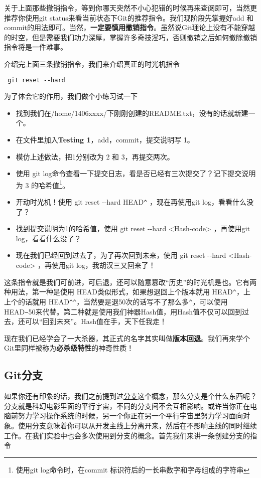 关于上面那些撤销指令，等到你哪天突然不小心犯错的时候再来查阅即可，当然更推荐你使用git status来看当前状态下Git的推荐指令。我们现阶段先掌握好add 和commit的用法即可。当然，\textbf{一定要慎用撤销指令}。虽然说Git理论上没有不能穿越的时空，但是需要我们功力深厚，掌握许多奇技淫巧，否则撤销之后如何撤除撤销指令将是一件难事。

介绍完上面三条撤销指令，我们来介绍真正的时光机指令

\begin{verbatim}
 git reset --hard
\end{verbatim}

为了体会它的作用，我们做个小练习试一下

\begin{exercise}
	\begin{itemize}
		\item 找到我们在/home/1406xxxx/下刚刚创建的README.txt，没有的话就新建一个。
		\item 在文件里加入\textbf{Testing 1}，add，commit，提交说明写 1。
		\item 模仿上述做法，把1分别改为 2 和 3，再提交两次。
		\item 使用 git log命令查看一下提交日志，看是否已经有三次提交了？记下提交说明为 3 的哈希值\footnote{使用git log命令时，在commit 标识符后的一长串数字和字母组成的字符串}。
		\item 开动时光机！使用 git reset -{}-hard HEAD\verb|^| ，现在再使用git log，看看什么没了？
		\item 找到提交说明为1的哈希值，使用 git reset -{}-hard <Hash-code> ，再使用git log，看看什么没了？
		\item 现在我们已经回到过去了，为了再次回到未来，使用 git reset -{}-hard <Hash-code> ，再使用git log，我胡汉三又回来了！
	\end{itemize}
\end{exercise}

这条指令就是我们可前进，可后退，还可以随意篡改“历史”的时光机是也。它有两种用法，第一种是使用 HEAD类似形式，如果想退回上个版本就用 HEAD\verb|^|，上上个的话就用 HEAD\verb|^|\verb|^|，当然要是退50次的话写不了那么多\verb|^|，可以使用HEAD\verb|~|50来代替。第二种就是使用我们神器Hash值，用Hash值不仅可以回到过去，还可以“回到未来”。Hash值在手，天下任我走！

现在我们已经学会了一大杀器，其正式的名字其实叫做\textbf{版本回退}。我们再来学个Git里同样被称为\textbf{必杀级特性}的神奇性质！

\subsection{Git分支}
如果你还有印象的话，我们之前提到过\hyperref[分支]{分支}这个概念，那么分支是个什么东西呢？分支就是科幻电影里面的平行宇宙，不同的分支间不会互相影响。或许当你正在电脑前努力学习操作系统的时候，另一个你正在另一个平行宇宙里努力学习面向对象。使用分支意味着你可以从开发主线上分离开来，然后在不影响主线的同时继续工作。在我们实验中也会多次使用到分支的概念。首先我们来讲一条创建分支的指令\label{git branch}

